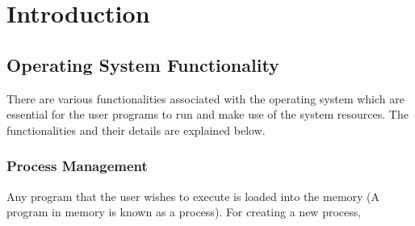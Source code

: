 \chapter{Introduction}
\label{chp:osintro}
%
%

\section{Operating System Functionality}
There are various functionalities associated with the operating system which are essential for the user programs to run and make use of the system resources. The functionalities and their details are explained below.

\subsection{Process Management}
Any program that the user wishes to execute is loaded into the memory (A program in memory is known as a process). For creating a new process,

